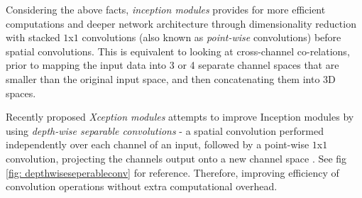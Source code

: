 Considering the above facts, \textit{inception modules} provides for more efficient computations and deeper network architecture through dimensionality reduction with stacked $1$x$1$ convolutions (also known as \textit{point-wise} convolutions) before spatial convolutions. This is equivalent to looking at cross-channel co-relations, prior to mapping the input data into 3 or 4 separate channel spaces that are smaller than the original input space, and then concatenating them into 3D spaces\cite{DBLPI:journals/corr/SzegedyLJSRAEVR14}.

Recently proposed \textit{Xception modules} \cite{DBLP:journals/corr/Chollet16a} attempts to improve Inception modules by using \textit{depth-wise separable convolutions} - a spatial convolution performed independently over each channel of an input, followed by a point-wise $1$x$1$ convolution, projecting the channels output onto a new channel space \cite{DBLPMNv1:journals/corr/HowardZCKWWAA17}. See fig \ref{fig: depthwiseseperableconv} for reference. Therefore, improving efficiency of convolution operations without extra computational overhead.
  

